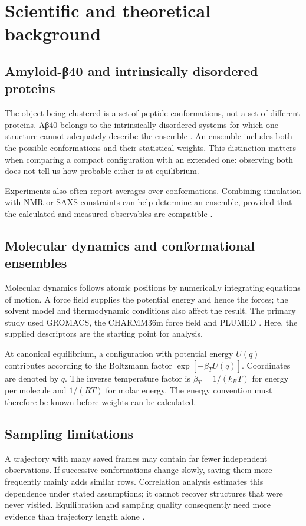 \chapter{Scientific and theoretical background}
\label{ch:background}
\section{Amyloid-β40 and intrinsically disordered proteins}
The object being clustered is a set of peptide conformations, not a set of different proteins. Aβ40 belongs to the intrinsically disordered systems for which one structure cannot adequately describe the ensemble \autocite{vanderlee2014,cadenelli2026}. An ensemble includes both the possible conformations and their statistical weights. This distinction matters when comparing a compact configuration with an extended one: observing both does not tell us how probable either is at equilibrium.

Experiments also often report averages over conformations. Combining simulation with NMR or SAXS constraints can help determine an ensemble, provided that the calculated and measured observables are compatible \autocite{borthakur2025}.

\section{Molecular dynamics and conformational ensembles}
Molecular dynamics follows atomic positions by numerically integrating equations of motion. A force field supplies the potential energy and hence the forces; the solvent model and thermodynamic conditions also affect the result. The primary study used GROMACS, the CHARMM36m force field and PLUMED \autocite{cadenelli2026,abraham2015,huang2017,tribello2014}. Here, the supplied descriptors are the starting point for analysis.

At canonical equilibrium, a configuration with potential energy $U(q)$ contributes according to the Boltzmann factor $\exp[-\beta_T U(q)]$. Coordinates are denoted by $q$. The inverse temperature factor is $\beta_T=1/(k_B T)$ for energy per molecule and $1/(RT)$ for molar energy. The energy convention must therefore be known before weights can be calculated.

\section{Sampling limitations}
A trajectory with many saved frames may contain far fewer independent observations. If successive conformations change slowly, saving them more frequently mainly adds similar rows. Correlation analysis estimates this dependence under stated assumptions; it cannot recover structures that were never visited. Equilibration and sampling quality consequently need more evidence than trajectory length alone \autocite{chodera2016,grossfield2019}.

